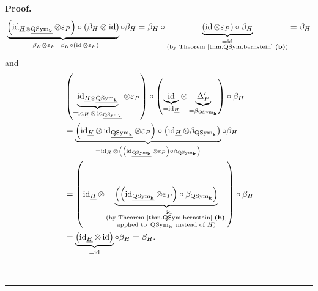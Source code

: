 \documentclass
[numbers=enddot,12pt,final,onecolumn,notitlepage,abstracton]{scrartcl}%
\theoremstyle{definition}
\newenvironment{proof}[1][Proof]{\noindent\textbf{#1.} }{\ \rule{0.5em}{0.5em}}
\begin{document}
\begin{proof}
\[
\underbrace{\left(  \operatorname*{id}\nolimits_{\underline{H}\otimes
\underline{\operatorname*{QSym}\nolimits_{\mathbf{k}}}}\otimes\varepsilon
_{P}\right)  \circ\left(  \beta_{H}\otimes\operatorname*{id}\right)  }%
_{=\beta_{H}\otimes\varepsilon_{P}=\beta_{H}\circ\left(  \operatorname*{id}%
\otimes\varepsilon_{P}\right)  }\circ\beta_{H}=\beta_{H}\circ
\underbrace{\left(  \operatorname*{id}\otimes\varepsilon_{P}\right)
\circ\beta_{H}}_{\substack{=\operatorname*{id}\\\text{(by Theorem
\ref{thm.QSym.bernstein} \textbf{(b)})}}}=\beta_{H}%
\]
and%
\begin{align*}
&  \left(  \underbrace{\operatorname*{id}\nolimits_{\underline{H}%
\otimes\underline{\operatorname*{QSym}\nolimits_{\mathbf{k}}}}}%
_{=\operatorname*{id}\nolimits_{\underline{H}}\otimes\operatorname*{id}%
\nolimits_{\underline{\operatorname*{QSym}\nolimits_{\mathbf{k}}}}}%
\otimes\varepsilon_{P}\right)  \circ\left(  \underbrace{\operatorname*{id}%
}_{=\operatorname*{id}\nolimits_{\underline{H}}}\otimes\underbrace{\Delta
_{P}^{\prime}}_{=\beta_{\operatorname*{QSym}\nolimits_{\mathbf{k}}}}\right)
\circ\beta_{H}\\
&  =\underbrace{\left(  \operatorname*{id}\nolimits_{\underline{H}}%
\otimes\operatorname*{id}\nolimits_{\underline{\operatorname*{QSym}%
\nolimits_{\mathbf{k}}}}\otimes\varepsilon_{P}\right)  \circ\left(
\operatorname*{id}\nolimits_{\underline{H}}\otimes\beta_{\operatorname*{QSym}%
\nolimits_{\mathbf{k}}}\right)  }_{=\operatorname*{id}\nolimits_{\underline{H}%
}\otimes\left(  \left(  \operatorname*{id}%
\nolimits_{\underline{\operatorname*{QSym}\nolimits_{\mathbf{k}}}}%
\otimes\varepsilon_{P}\right)  \circ\beta_{\operatorname*{QSym}%
\nolimits_{\mathbf{k}}}\right)  }\circ\beta_{H}\\
&  =\left(  \operatorname*{id}\nolimits_{\underline{H}}\otimes
\underbrace{\left(  \left(  \operatorname*{id}%
\nolimits_{\underline{\operatorname*{QSym}\nolimits_{\mathbf{k}}}}%
\otimes\varepsilon_{P}\right)  \circ\beta_{\operatorname*{QSym}%
\nolimits_{\mathbf{k}}}\right)  }_{\substack{=\operatorname*{id}\\\text{(by
Theorem \ref{thm.QSym.bernstein} \textbf{(b)},}\\\text{applied to
}\operatorname*{QSym}\nolimits_{\mathbf{k}}\text{ instead of }H\text{)}%
}}\right)  \circ\beta_{H}\\
&  =\underbrace{\left(  \operatorname*{id}\nolimits_{\underline{H}}%
\otimes\operatorname*{id}\right)  }_{=\operatorname*{id}}\circ\beta_{H}%
=\beta_{H}.
\end{align*}



\end{proof}
\end{document}
